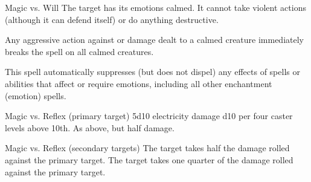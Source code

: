 \begin{spellheader}
\end{spellheader}
\begin{spelleffects}
    \begin{spellattack}{Magic vs. Will}
        \spellsuccess The target has its emotions calmed. It cannot take violent actions (although it can defend itself) or do anything destructive.
    \end{spellattack}
\end{spelleffects}
\begin{spellfooter}
    \spellnotes Any aggressive action against or damage dealt to a calmed creature immediately breaks the spell on all calmed creatures.

    This spell automatically suppresses (but does not dispel) any effects of spells or abilities that affect or require emotions, including all other enchantment (emotion) spells.
\end{spellfooter}

\begin{spellheader}
    \spellrng{\rngmed}
\end{spellheader}
\begin{spelleffects}
    \begin{spellattack}{Magic vs. Reflex (primary target)}
        \spellsuccess 5d10 electricity damage \add d10 per four caster levels above 10th. 
        \spellfailure As above, but half damage.
    \end{spellattack}
    \begin{spellattack}{Magic vs. Reflex (secondary targets)}
        \spellsuccess The target takes half the damage rolled against the primary target.
        \spellfailure The target takes one quarter of the damage rolled against the primary target.
    \end{spellattack}
\end{spelleffects}
\begin{spellfooter}

\end{spellfooter}

